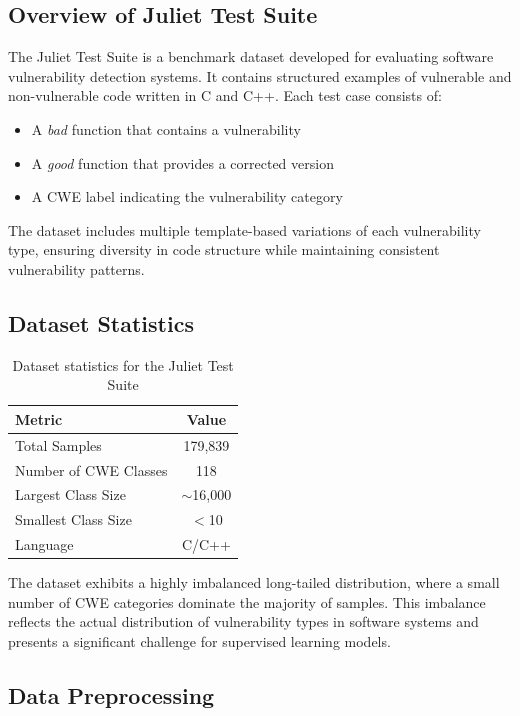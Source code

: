 \documentclass[conference]{IEEEtran}
\begin{document}
\subsection{Overview of Juliet Test Suite}

The Juliet Test Suite is a benchmark dataset developed for evaluating software vulnerability detection systems. It contains structured examples of vulnerable and non-vulnerable code written in C and C++. Each test case consists of:
\begin{itemize}
    \item A \textit{bad} function that contains a vulnerability
    \item A \textit{good} function that provides a corrected version
    \item A CWE label indicating the vulnerability category
\end{itemize}
The dataset includes multiple template-based variations of each vulnerability type, ensuring diversity in code structure while maintaining consistent vulnerability patterns.

\subsection{Dataset Statistics}

\begin{table}[t]
\centering
\caption{Dataset statistics for the Juliet Test Suite}
\begin{tabular}{lc}
\toprule
Metric & Value \\
\midrule
Total Samples & 179,839 \\
Number of CWE Classes & 118 \\
Largest Class Size & $\sim$16,000 \\
Smallest Class Size & $<$10 \\
Language & C/C++ \\
\bottomrule
\end{tabular}
\end{table}

The dataset exhibits a highly imbalanced long-tailed distribution, where a small number of CWE categories dominate the majority of samples. This imbalance reflects the actual distribution of vulnerability types in software systems and presents a significant challenge for supervised learning models.

\subsection{Data Preprocessing}
\end{document}
